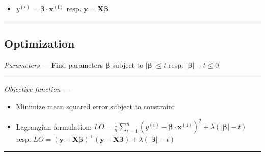 \begin{itemize}
    \item $y^{(i)} = \boldsymbol{\beta} \cdot \boldsymbol{x^{(i)}}$ resp. $\boldsymbol{y} = \boldsymbol{X}\boldsymbol{\beta}$
\end{itemize}

{\color{black}\hrule height 0.001mm}

\subsection*{Optimization}
\emph{Parameters} --- Find parameters $\boldsymbol{\beta}$ subject to $|\boldsymbol{\beta}| \leq t$ resp. $|\boldsymbol{\beta}| - t \leq 0$

{\color{lightgray}\hrule height 0.001mm}

\emph{Objective function} --- 
\begin{itemize}
    \item Minimize mean squared error subject to constraint
    \item Lagrangian formulation: $LO = \frac{1}{n} \sum_{i=1}^n ( y^{(i)} - \boldsymbol{\beta} \cdot \boldsymbol{x^{(i)}} )^2 + \lambda ( |\boldsymbol{\beta}| - t )$ resp. $LO = ( \boldsymbol{y} - \boldsymbol{X}\boldsymbol{\beta})^\intercal( \boldsymbol{y} - \boldsymbol{X}\boldsymbol{\beta} ) + \lambda ( |\boldsymbol{\beta}| - t )$
\end{itemize}

{\color{lightgray}\hrule height 0.001mm}

